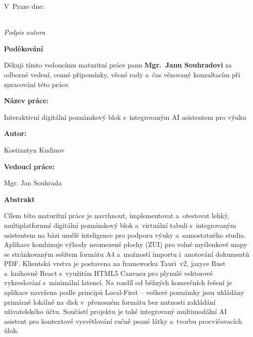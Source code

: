 \documentclass[12pt, a4paper, oneside]{article}
\newcommand{\NazevPrace}{Interaktivní digitální poznámkový blok s~integrovaným AI asistentem pro výuku}
\newcommand{\Autor}{Kostiantyn Kudinov}
\newcommand{\Vedouci}{Mgr. Jan Souhrada}
\newcommand{\VedouciDativ}{Mgr.~Janu Souhradovi}
\newcommand{\nadpismimoobsah}[1]{%
    \vspace{6pt}%
    {\normalfont\fontsize{14pt}{18pt}\selectfont\sffamily\bfseries #1\par}%
    \vspace{2pt}%
}
\begin{document}
\vspace{1.2cm}
V~Praze dne: \makebox[4cm]{\dotfill}

\vspace{1.8cm}
\makebox[6cm]{\dotfill} \\
\textit{Podpis autora}

\clearpage

\vspace*{6.5cm}

\nadpismimoobsah{Poděkování}

Děkuji tímto vedoucímu maturitní práce panu \textbf{\VedouciDativ} za odborné vedení, cenné připomínky, věcné rady a~čas věnovaný konzultacím při zpracování této práce.

\clearpage

\pagestyle{fancy}
\setcounter{page}{5}

\nadpismimoobsah{Název práce:}
\NazevPrace

\nadpismimoobsah{Autor:}
\Autor

\nadpismimoobsah{Vedoucí práce:}
\Vedouci

\nadpismimoobsah{Abstrakt}
Cílem této maturitní práce je navrhnout, implementovat a~otestovat lehký, multiplatformní digitální poznámkový blok a~virtuální tabuli s~integrovaným asistentem na bázi umělé inteligence pro podporu výuky a~samostatného studia. Aplikace kombinuje výhody neomezené plochy (ZUI) pro volné myšlenkové mapy se stránkovaným sešitem formátu A4 a~možností importu i~anotování dokumentů PDF. Klientská vrstva je postavena na frameworku Tauri~v2, jazyce Rust a~knihovně React s~využitím HTML5 Canvasu pro plynulé vektorové vykreslování s~minimální latencí. Na rozdíl od běžných komerčních řešení je aplikace navržena podle principů Local-First – veškeré poznámky jsou ukládány primárně lokálně na disk v~přenosném formátu bez nutnosti zakládání uživatelského účtu. Součástí projektu je také integrovaný multimodální AI asistent pro kontextové vysvětlování ručně psané látky a~tvorbu procvičovacích úloh.
\end{document}

